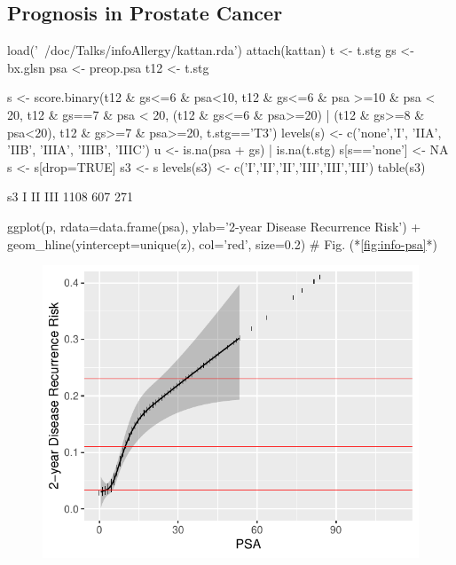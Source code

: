 \subsection{Prognosis in Prostate Cancer}
\begin{Schunk}
\begin{Sinput}
load('~/doc/Talks/infoAllergy/kattan.rda')
attach(kattan)
t   <- t.stg
gs  <- bx.glsn
psa <- preop.psa
t12 <- t.stg %

s <- score.binary(t12 & gs<=6 & psa<10,
                  t12 & gs<=6 & psa >=10 & psa < 20,
                  t12 & gs==7 & psa < 20,
                  (t12 & gs<=6 & psa>=20) |
                  (t12 & gs>=8 & psa<20),
                  t12 & gs>=7 & psa>=20,
                  t.stg=='T3')
levels(s) <- c('none','I', 'IIA', 'IIB', 'IIIA', 'IIIB', 'IIIC')
u <- is.na(psa + gs) | is.na(t.stg)
s[s=='none'] <- NA
s <- s[drop=TRUE]
s3 <- s
levels(s3) <- c('I','II','II','III','III','III')
table(s3)
\end{Sinput}
\begin{Soutput}
s3
   I   II  III 
1108  607  271 
\end{Soutput}
\begin{Sinput}
ggplot(p, rdata=data.frame(psa), ylab='2-year Disease Recurrence Risk') +
  geom_hline(yintercept=unique(z), col='red', size=0.2)   # Fig. (*\ref{fig:info-psa}*)
\end{Sinput}
\begin{figure}[htbp]

\centerline{\includegraphics[width=\maxwidth]{info-psa-1} }


\end{figure}
\end{Schunk}
